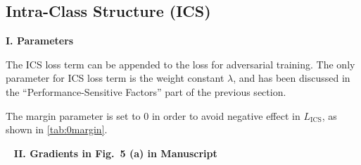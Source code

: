 \begin{table*}
	\caption{The margin parameter is set to $0$ in order to avoid negative effect.
	R@1 performance drops with marginal robustness gain.}
	\label{tab:0margin}
\end{table*}

\subsection{Intra-Class Structure (ICS)}

\noindent\textbf{I. Parameters}

The ICS loss term can be appended to the loss for adversarial training.
%
The only parameter for ICS loss term is the weight constant $\lambda$,
and has been discussed in the ``Performance-Sensitive Factors'' part
of the previous section.

The margin parameter is set to $0$ in order to avoid negative effect in $L_\text{ICS}$,
as shown in \cref{tab:0margin}.

~\newline
\noindent\textbf{II. Gradients in Fig.~5 (a) in Manuscript}

